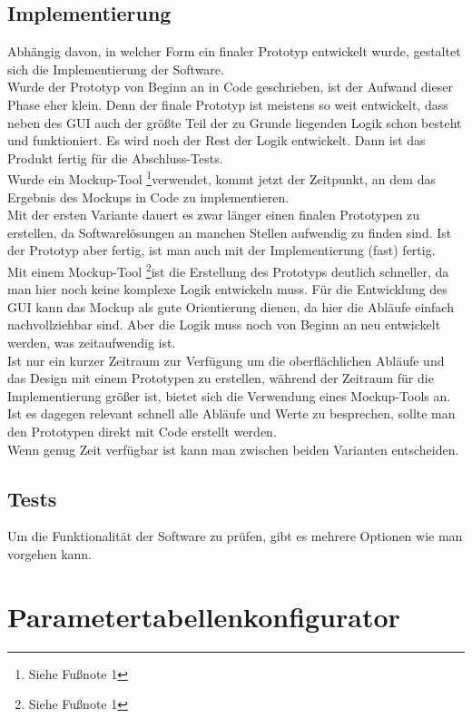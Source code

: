 \documentclass[10pt,a4paper]{article}
\begin{document}
\subsection{Implementierung}
Abhängig davon, in welcher Form ein finaler Prototyp entwickelt wurde, gestaltet sich die Implementierung der Software.
\\Wurde der Prototyp von Beginn an in Code geschrieben, ist der Aufwand dieser Phase eher klein. Denn der finale Prototyp ist meistens so weit entwickelt, dass neben des GUI auch der größte Teil der zu Grunde liegenden Logik schon besteht und funktioniert. Es wird noch der Rest der Logik entwickelt. Dann ist das Produkt fertig für die Abschluss-Tests.\\Wurde ein Mockup-Tool \footnote{Siehe Fußnote 1}verwendet, kommt jetzt der Zeitpunkt, an dem das Ergebnis des Mockups in Code zu implementieren. 
\\Mit der ersten Variante dauert es zwar länger einen finalen Prototypen zu erstellen, da Softwarelösungen an manchen Stellen aufwendig zu finden sind. Ist der Prototyp aber fertig, ist man auch mit der Implementierung (fast) fertig. 
\\Mit einem Mockup-Tool \footnote{Siehe Fußnote 1}ist die Erstellung des Prototyps deutlich schneller, da man hier noch keine komplexe Logik entwickeln muss. Für die Entwicklung des GUI kann das Mockup als gute Orientierung dienen, da hier die Abläufe einfach nachvollziehbar sind. Aber die Logik muss noch von Beginn an neu entwickelt werden, was zeitaufwendig ist. 
\\Ist nur ein kurzer Zeitraum zur Verfügung um die oberflächlichen Abläufe und das Design mit einem Prototypen zu erstellen, während der Zeitraum für die Implementierung größer ist, bietet sich die Verwendung eines Mockup-Tools an. Ist es dagegen relevant schnell alle Abläufe und Werte zu besprechen, sollte man den Prototypen direkt mit Code erstellt werden.\\
Wenn genug Zeit verfügbar ist kann man zwischen beiden Varianten entscheiden.
\subsection{Tests}
Um die Funktionalität der Software zu prüfen, gibt es mehrere Optionen wie man vorgehen kann.
 
\section{Parametertabellenkonfigurator}
\end{document}
